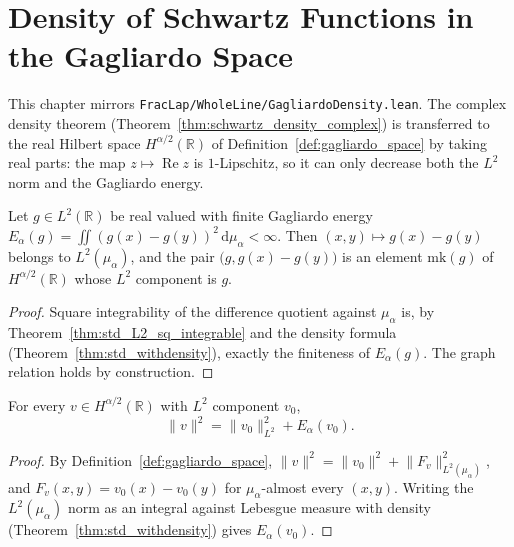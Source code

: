 \chapter{Density of Schwartz Functions in the Gagliardo Space}

This chapter mirrors \texttt{FracLap/WholeLine/GagliardoDensity.lean}. The complex density theorem (Theorem~\ref{thm:schwartz_density_complex}) is transferred to the real Hilbert space $H^{\alpha/2}(\mathbb{R})$ of Definition~\ref{def:gagliardo_space} by taking real parts: the map $z \mapsto \operatorname{Re} z$ is $1$-Lipschitz, so it can only decrease both the $L^2$ norm and the Gagliardo energy.

\begin{lemma}\label{lem:gagliardo_mk}
\leanok
Let $g \in L^2(\mathbb{R})$ be real valued with finite Gagliardo energy $E_\alpha(g) = \iint (g(x) - g(y))^2 \, \mathrm{d}\mu_\alpha < \infty$. Then $(x, y) \mapsto g(x) - g(y)$ belongs to $L^2(\mu_\alpha)$, and the pair $\bigl(g, g(x) - g(y)\bigr)$ is an element $\mathrm{mk}(g)$ of $H^{\alpha/2}(\mathbb{R})$ whose $L^2$ component is $g$.
\end{lemma}

\begin{proof}
\leanok
Square integrability of the difference quotient against $\mu_\alpha$ is, by Theorem~\ref{thm:std_L2_sq_integrable} and the density formula (Theorem~\ref{thm:std_withdensity}), exactly the finiteness of $E_\alpha(g)$. The graph relation holds by construction.
\end{proof}

\begin{theorem}\label{thm:norm_gagliardo_space}
\leanok
For every $v \in H^{\alpha/2}(\mathbb{R})$ with $L^2$ component $v_0$,
\[
  \lVert v \rVert^2 = \lVert v_0 \rVert_{L^2}^2 + E_\alpha(v_0).
\]
\end{theorem}

\begin{proof}
\leanok
By Definition~\ref{def:gagliardo_space}, $\lVert v \rVert^2 = \lVert v_0 \rVert^2 + \lVert F_v \rVert^2_{L^2(\mu_\alpha)}$, and $F_v(x, y) = v_0(x) - v_0(y)$ for $\mu_\alpha$-almost every $(x, y)$. Writing the $L^2(\mu_\alpha)$ norm as an integral against Lebesgue measure with density (Theorem~\ref{thm:std_withdensity}) gives $E_\alpha(v_0)$.
\end{proof}

